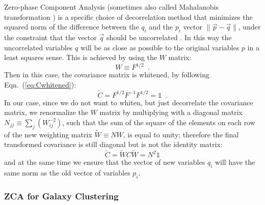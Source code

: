 Zero-phase Component Analysis (sometimes also called Mahalanobis transformation \cite{kessy_optimal_2015}) is a specific choice of decorrelation method that 
minimizes the squared norm of the difference between the $q_i$
and the $p_i$ vector $\|\vec{p}-\vec{q}\|$, under the constraint that the vector $\vec{q}$ should be uncorrelated \cite{kessy_optimal_2015}. 
In this way the uncorrelated variables $q$ will be as close 
as possible to the original variables $p$ in a least squares sense. 
This is achieved by using the $W$ matrix:
\begin{equation}
W \equiv F^{1/2} \,\,\, .
\end{equation}
Then in this case, the covariance matrix is whitened, by following Eqn.\ (\ref{eq:Cwhitened}):
\begin{equation}
\tilde{C} =F^{1/2}F^{-1}F^{1/2}=\mathbb{1} \,\,\, .
\end{equation}
In our case, since we do not want to whiten, but just decorrelate the covariance matrix,
we renormalize the $W$ matrix by multiplying with a diagonal matrix $N_{jj}\equiv\sum_j(W_{ij}^{-2})$, such that the sum of the square of the 
elements on each row of the new weighting matrix 
$\tilde{W} \equiv N W$, is equal to unity; therefore the final
transformed covariance is still diagonal but is not the identity matrix: 
\begin{equation}
\tilde{C}=\tilde{W}C\tilde{W}=N^{2} \mathbb{1} \label{eq:Ctilde-decor}
\end{equation}
and at the same time we ensure that 
the vector of new variables $q_i$ will have the same norm as the old vector of variables $p_i$.

\subsubsection{ZCA for Galaxy Clustering \label{subsub:ZCA-GC}}



